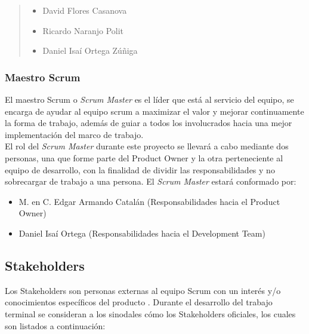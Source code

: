         
    \begin{quote}
    \begin{itemize}
        \item David Flores Casanova
        \item Ricardo Naranjo Polit
        \item Daniel Isaí Ortega Zúñiga
    \end{itemize}
    \end{quote}

\subsubsection{Maestro Scrum}

 El maestro Scrum o {\it Scrum Master} es el líder que está al servicio del equipo,
 se encarga de ayudar al equipo scrum a maximizar el valor y mejorar continuamente la
 forma de trabajo, además de guiar a todos los involucrados hacia una mejor implementación
 del marco de trabajo.\\

 \noindent El rol del {\it Scrum Master} durante este proyecto se llevará a cabo mediante
 dos personas, una que forme parte del Product Owner y la otra perteneciente al equipo de
 desarrollo, con la finalidad de dividir las responsabilidades y no sobrecargar de trabajo
 a una persona. El {\it Scrum Master} estará conformado por:

    \begin{itemize}
        \item M. en C. Edgar Armando Catalán (Responsabilidades hacia el Product Owner)
        \item Daniel Isaí Ortega (Responsabilidades hacia el Development Team)
    \end{itemize}                        

\subsection{Stakeholders}

 Los Stakeholders son personas externas al equipo Scrum con un interés y/o conocimientos
 específicos del producto \cite{ScrumGlosary}. Durante el desarrollo del trabajo terminal
 se consideran a los sinodales cómo los Stakeholders oficiales, los cuales son listados a
 continuación:

